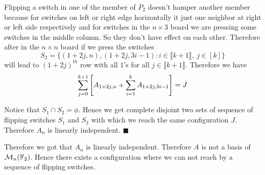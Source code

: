 \documentclass[a4paper, 11pt]{article}
\renewenvironment{proof}{\noindent{\it \textbf{Proof:}}\hspace*{1em}}{\hfill $\blacksquare$\bigskip\\}
\begin{document}
{\begin{proof}
\begin{itemize}
		Flipping a switch in one of the member of $P_2$ doesn't hamper another member because for switches on left or right edge horizontally it just one neighbor at right or left side respectively and for switches in the $n\times 3$ board we are pressing some switches in the middle column. So they don't have effect on each other.  Therefore after in the $n\times n$ board if we press the switches $$S_2=\{(1+2j,n),(1+2j,3i-1)\colon i\in\llbracket k+1\rrbracket,\ j\in[k]\}$$ will lead to $(1+2j)^{th}$ row with all $1$'s for all $j\in\llbracket k+1\rrbracket$. Therefore we have $$\sum_{j=0}^{k+1}\left[A_{1+2j,n}+ \sum_{i=1}^kA_{1+2j,3i-1}\right]=J$$
	\end{itemize}
Notice that $S_1\cap S_2=\phi$. Hence we get complete disjoint two sets of sequence of flipping switches $S_1$ and $S_2$ with which we reach the same configuration $J$. Therefore $A_n$ is linearly independent.
\end{proof}

Therefore we got that $A_n$ is linearly independent. Therefore $A$ is not a basis of $\mathcal{M}_n(\mathbb{F}_2)$. Hence there exists a configuration where we can not reach by a sequence of flipping switches.
}
\pagebreak
\end{document}
